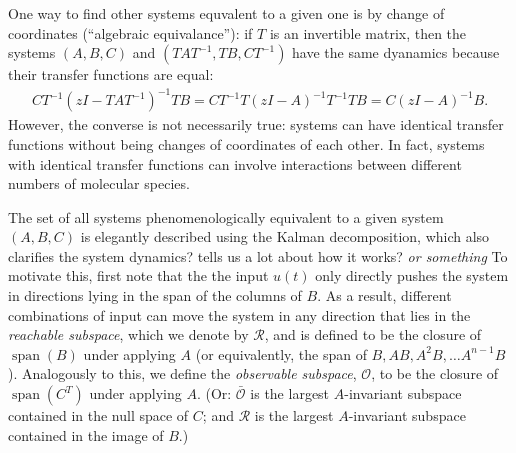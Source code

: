 \documentclass[11 pt]{article}
\newcommand{\plr}[1]{{\color{blue}\it #1}}
\newcommand{\reachable}{\mathcal{R}}
\newcommand{\unobservable}{\bar{\mathcal{O}}}
\DeclareMathOperator{\spn}{span}
\begin{document}
One way to find other systems equvalent to a given one
is by change of coordinates (``algebraic equivalance''):
if $T$ is an invertible matrix, then the systems $(A,B,C)$ and $(TAT^{-1},TB,CT^{-1})$
have the same dyanamics because their transfer functions are equal:
\begin{align*}
    CT^{-1}( zI - TAT^{-1})^{-1}TB
    =
    CT^{-1}T( zI - A)^{-1}T^{-1}TB
    =
    C( zI - A)^{-1}B .
\end{align*}
However, the converse is not necessarily true: 
systems can have identical transfer functions without being changes of coordinates of each other.
In fact, systems with identical transfer functions can involve interactions between different
numbers of molecular species.

The set of all systems phenomenologically equivalent to a given system $(A,B,C)$ 
is elegantly described using the Kalman decomposition,
which also clarifies the system dynamics? tells us a lot about how it works? \plr{or something}
To motivate this, first note that the the input $u(t)$ only directly pushes the system
in directions lying in the span of the columns of $B$.
As a result, different combinations of input can 
move the system in any direction that lies in the \emph{reachable subspace},
which we denote by $\reachable$,
and is defined to be the closure of $\spn(B)$ under applying $A$
(or equivalently, the span of $B, AB, A^2B, \ldots A^{n-1}B$).
Analogously to this, we define
the \emph{observable subspace}, $\mathcal{O}$,
to be the closure of $\spn(C^T)$ under applying $A$.
(Or: $\unobservable$ is the largest $A$-invariant subspace
contained in the null space of $C$;
and $\reachable$ is the largest $A$-invariant subspace contained in the image of $B$.)
\end{document}
